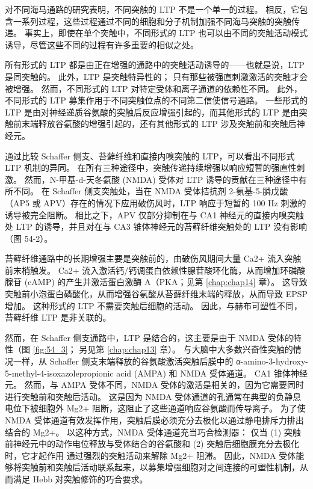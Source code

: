 对不同海马通路的研究表明，不同突触的 LTP 不是一个单一的过程。
相反，它包含一系列过程，这些过程通过不同的细胞和分子机制加强不同海马突触的突触传递。
事实上，即使在单个突触中，不同形式的 LTP 也可以由不同的突触活动模式诱导，尽管这些不同的过程有许多重要的相似之处。


所有形式的 LTP 都是由正在增强的通路中的突触活动诱导的——也就是说，LTP 是同突触的。
此外，LTP 是突触特异性的；
只有那些被强直刺激激活的突触才会被增强。
然而，不同形式的 LTP 对特定受体和离子通道的依赖性不同。 此外，不同形式的 LTP 募集作用于不同突触位点的不同第二信使信号通路。
一些形式的 LTP 是由对神经递质谷氨酸的突触后反应增强引起的，而其他形式的 LTP 是由突触前末端释放谷氨酸的增强引起的，还有其他形式的 LTP 涉及突触前和突触后神经元。


通过比较 Schaffer 侧支、苔藓纤维和直接内嗅突触的 LTP，可以看出不同形式 LTP 机制的异同。
在所有三种途径中，突触传递持续增强以响应短暂的强直性刺激。
然而，N-甲基-d-天冬氨酸 (NMDA) 受体对 LTP 诱导的贡献在三种途径中有所不同。
在 Schaffer 侧支突触处，当在 NMDA 受体拮抗剂 2-氨基-5-膦戊酸（AP5 或 APV）存在的情况下应用破伤风时，LTP 响应于短暂的 100 Hz 刺激的诱导被完全阻断。
相比之下，APV 仅部分抑制在与 CA1 神经元的直接内嗅突触处 LTP 的诱导，并且对在与 CA3 锥体神经元的苔藓纤维突触处的 LTP 没有影响（图 54-2）。


苔藓纤维通路中的长期增强主要是突触前的，由破伤风期间大量 Ca2+ 流入突触前末梢触发。
Ca2+ 流入激活钙/钙调蛋白依赖性腺苷酸环化酶，从而增加环磷酸腺苷 (cAMP) 的产生并激活蛋白激酶 A（PKA；见第 \ref{chap:chap14} 章）。
这导致突触前小泡蛋白磷酸化，从而增强谷氨酸从苔藓纤维末端的释放，从而导致 EPSP 增加。
这种形式的 LTP 不需要突触后细胞的活动。
因此，与赫布可塑性不同，苔藓纤维 LTP 是非关联的。


然而，在 Schaffer 侧支通路中，LTP 是结合的，这主要是由于 NMDA 受体的特性（图 \ref{fig:54_3}；
另见第 \ref{chap:chap13} 章）。
与大脑中大多数兴奋性突触的情况一样，从 Schaffer 侧支末端释放的谷氨酸激活突触后膜中的 α-amino-3-hydroxy-5-methyl-4-isoxazolepropionic acid (AMPA) 和 NMDA 受体通道。
CA1 锥体神经元。 然而，与 AMPA 受体不同，NMDA 受体的激活是相关的，因为它需要同时进行突触前和突触后活动。
这是因为 NMDA 受体通道的孔通常在典型的负静息电位下被细胞外 Mg2+ 阻断，这阻止了这些通道响应谷氨酸而传导离子。
为了使 NMDA 受体通道有效发挥作用，突触后膜必须充分去极化以通过静电排斥力排出结合的 Mg2+。
以这种方式，NMDA 受体通道充当巧合检测器：
仅当 (1) 突触前神经元中的动作电位释放与受体结合的谷氨酸和 (2) 突触后细胞膜充分去极化时，它才起作用 通过强烈的突触活动来解除 Mg2+ 阻滞。
因此，NMDA 受体能够将突触前和突触后活动联系起来，以募集增强细胞对之间连接的可塑性机制，从而满足 Hebb 对突触修饰的巧合要求。


